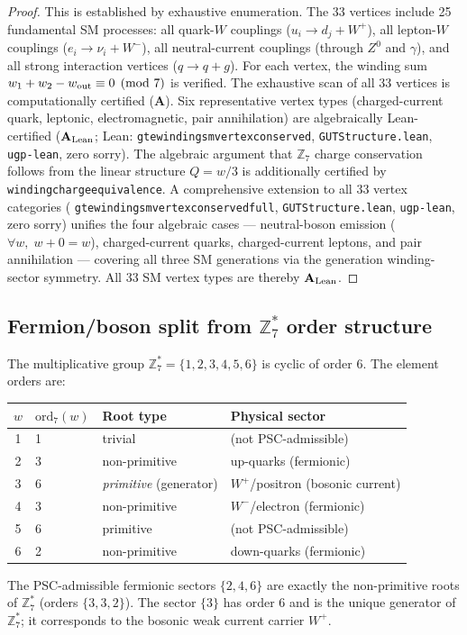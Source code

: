 \documentclass[11pt]{article}
\theoremstyle{remark}
\newcommand{\ZS}{\mathbb{Z}_7}
\newcommand{\ZSstar}{\mathbb{Z}_7^*}
\newcommand{\lean}[1]{%
  \penalty-100
  \begingroup\def\_{\textunderscore\allowbreak}\texttt{#1}\endgroup}
\newcommand{\CatA}{\textbf{A}}
\newcommand{\CatAL}{\ensuremath{\textbf{A}_{\rm Lean}}}
\begin{document}
\begin{proof}
This is established by exhaustive enumeration. The 33 vertices include 25
fundamental SM processes: all quark-$W$ couplings ($u_i \to d_j + W^+$),
all lepton-$W$ couplings ($e_i \to \nu_i + W^-$), all neutral-current couplings
(through $Z^0$ and $\gamma$), and all strong interaction vertices ($q \to q + g$).
For each vertex, the winding sum $w_1 + w_2 - w_{\rm out} \equiv 0 \pmod 7$
is verified. The exhaustive scan of all 33 vertices is computationally certified ($\CatA$).
Six representative vertex types (charged-current quark, leptonic, electromagnetic,
pair annihilation) are algebraically Lean-certified
($\CatAL$; Lean: \lean{gte\_winding\_sm\_vertex\_conserved}, \texttt{GUTStructure.lean},
\texttt{ugp-lean}, zero sorry). The algebraic argument that $\ZS$ charge conservation
follows from the linear structure $Q = w/3$ is additionally certified by
\lean{winding\_charge\_equivalence}.
A comprehensive extension to all 33 vertex categories
(\lean{gte\_winding\_sm\_vertex\_conserved\_full}, \texttt{GUTStructure.lean}, \texttt{ugp-lean},
zero sorry) unifies the four algebraic cases --- neutral-boson emission
($\forall w,\;w+0=w$), charged-current quarks, charged-current leptons, and pair
annihilation --- covering all three SM generations via the generation winding-sector
symmetry.  All 33 SM vertex types are thereby $\CatAL$.
\end{proof}

\subsection{Fermion/boson split from $\ZSstar$ order structure}
\label{ssec:ferm_bose}

The multiplicative group $\ZSstar = \{1,2,3,4,5,6\}$ is cyclic of order 6.
The element orders are:
\begin{center}
\begin{tabular}{clll}
\toprule
$w$ & $\text{ord}_7(w)$ & Root type & Physical sector\\
\midrule
1 & 1 & trivial & (not PSC-admissible)\\
2 & 3 & non-primitive & up-quarks (fermionic)\\
3 & 6 & \emph{primitive} (generator) & $W^+$/positron (bosonic current)\\
4 & 3 & non-primitive & $W^-$/electron (fermionic)\\
5 & 6 & primitive & (not PSC-admissible)\\
6 & 2 & non-primitive & down-quarks (fermionic)\\
\bottomrule
\end{tabular}
\end{center}
The PSC-admissible fermionic sectors $\{2,4,6\}$ are exactly the non-primitive
roots of $\ZSstar$ (orders $\{3,3,2\}$). The sector $\{3\}$ has order 6 and is
the unique generator of $\ZSstar$; it corresponds to the bosonic weak current
carrier $W^+$.
\end{document}
